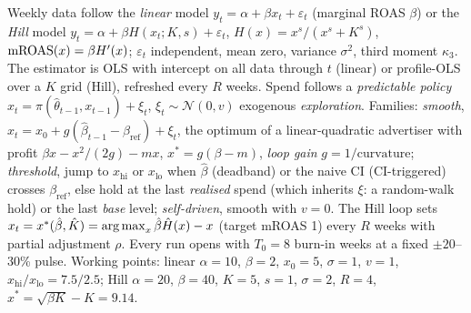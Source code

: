 \begin{definition}
\label{fb:def:loops}
Weekly data follow the \emph{linear} model $y_t = \alpha + \beta x_t + \varepsilon_t$ (marginal ROAS $\beta$) or the \emph{Hill} model $y_t = \alpha + \beta H(x_t; K, s) + \varepsilon_t$, $H(x) = x^s/(x^s + K^s)$, $\mathrm{mROAS}(x) = \beta H'(x)$; $\varepsilon_t$ independent, mean zero, variance $\sigma^2$, third moment $\kappa_3$. The estimator is OLS with intercept on all data through $t$ (linear) or profile-OLS over a $K$ grid (Hill), refreshed every $R$ weeks. Spend follows a \emph{predictable policy} $x_t = \pi(\hat\theta_{t-1}, x_{t-1}) + \xi_t$, $\xi_t \sim \mathcal N(0, v)$ exogenous \emph{exploration}. Families: \emph{smooth}, $x_t = x_0 + g(\hat\beta_{t-1} - \beta_{\mathrm{ref}}) + \xi_t$, the optimum of a linear-quadratic advertiser with profit $\beta x - x^2/(2g) - mx$, $x^* = g(\beta - m)$, \emph{loop gain} $g = 1/\text{curvature}$; \emph{threshold}, jump to $x_{\mathrm{hi}}$ or $x_{\mathrm{lo}}$ when $\hat\beta$ (deadband) or the naive CI (CI-triggered) crosses $\beta_{\mathrm{ref}}$, else hold at the last \emph{realised} spend (which inherits $\xi$: a random-walk hold) or the last \emph{base} level; \emph{self-driven}, smooth with $v = 0$. The Hill loop sets $x_t = x^*(\hat\beta, \hat K) = \operatorname*{arg\,max}_x\hat\beta\hat H(x) - x$ (target mROAS 1) every $R$ weeks with partial adjustment $\rho$. Every run opens with $T_0 = 8$ burn-in weeks at a fixed $\pm 20$--30\% pulse. Working points: linear $\alpha = 10$, $\beta = 2$, $x_0 = 5$, $\sigma = 1$, $v = 1$, $x_{\mathrm{hi}}/x_{\mathrm{lo}} = 7.5/2.5$; Hill $\alpha = 20$, $\beta = 40$, $K = 5$, $s = 1$, $\sigma = 2$, $R = 4$, $x^* = \sqrt{\beta K} - K = 9.14$.
\end{definition}

